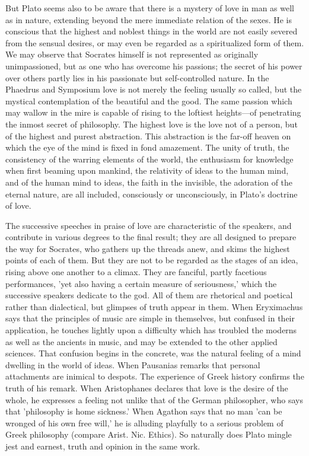 \documentclass[11pt,letter]{article}
\begin{document}
\par  But Plato seems also to be aware that there is a mystery of love in man as well as in nature, extending beyond the mere immediate relation of the sexes. He is conscious that the highest and noblest things in the world are not easily severed from the sensual desires, or may even be regarded as a spiritualized form of them. We may observe that Socrates himself is not represented as originally unimpassioned, but as one who has overcome his passions; the secret of his power over others partly lies in his passionate but self-controlled nature. In the Phaedrus and Symposium love is not merely the feeling usually so called, but the mystical contemplation of the beautiful and the good. The same passion which may wallow in the mire is capable of rising to the loftiest heights—of penetrating the inmost secret of philosophy. The highest love is the love not of a person, but of the highest and purest abstraction. This abstraction is the far-off heaven on which the eye of the mind is fixed in fond amazement. The unity of truth, the consistency of the warring elements of the world, the enthusiasm for knowledge when first beaming upon mankind, the relativity of ideas to the human mind, and of the human mind to ideas, the faith in the invisible, the adoration of the eternal nature, are all included, consciously or unconsciously, in Plato's doctrine of love.

\par  The successive speeches in praise of love are characteristic of the speakers, and contribute in various degrees to the final result; they are all designed to prepare the way for Socrates, who gathers up the threads anew, and skims the highest points of each of them. But they are not to be regarded as the stages of an idea, rising above one another to a climax. They are fanciful, partly facetious performances, 'yet also having a certain measure of seriousness,' which the successive speakers dedicate to the god. All of them are rhetorical and poetical rather than dialectical, but glimpses of truth appear in them. When Eryximachus says that the principles of music are simple in themselves, but confused in their application, he touches lightly upon a difficulty which has troubled the moderns as well as the ancients in music, and may be extended to the other applied sciences. That confusion begins in the concrete, was the natural feeling of a mind dwelling in the world of ideas. When Pausanias remarks that personal attachments are inimical to despots. The experience of Greek history confirms the truth of his remark. When Aristophanes declares that love is the desire of the whole, he expresses a feeling not unlike that of the German philosopher, who says that 'philosophy is home sickness.' When Agathon says that no man 'can be wronged of his own free will,' he is alluding playfully to a serious problem of Greek philosophy (compare Arist. Nic. Ethics). So naturally does Plato mingle jest and earnest, truth and opinion in the same work.
\end{document}
